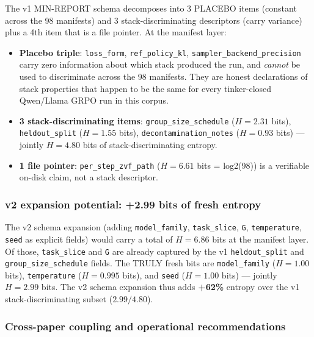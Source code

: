 \documentclass{article}  \usepackage[preprint,nonatbib]{neurips_2026} \usepackage[numbers]{natbib}
\begin{document}
The v1 MIN-REPORT schema decomposes into 3 PLACEBO items (constant across the 98 manifests) and 3 stack-discriminating descriptors (carry variance) plus a 4th item that is a file pointer. At the manifest layer:
\begin{itemize}
  \item \textbf{Placebo triple}: \texttt{loss\_form}, \texttt{ref\_policy\_kl}, \texttt{sampler\_backend\_precision} carry zero information about which stack produced the run, and \emph{cannot} be used to discriminate across the 98 manifests. They are honest declarations of stack properties that happen to be the same for every tinker-closed Qwen/Llama GRPO run in this corpus.
  \item \textbf{3 stack-discriminating items}: \texttt{group\_size\_schedule} ($H{=}2.31$ bits), \texttt{heldout\_split} ($H{=}1.55$ bits), \texttt{decontamination\_notes} ($H{=}0.93$ bits) --- jointly $H{=}4.80$ bits of stack-discriminating entropy.
  \item \textbf{1 file pointer}: \texttt{per\_step\_zvf\_path} ($H{=}6.61$ bits = log2(98)) is a verifiable on-disk claim, not a stack descriptor.
\end{itemize}

\subsubsection{v2 expansion potential: +2.99 bits of fresh entropy}
\label{sec:p5-iter169-v2-expansion}

The v2 schema expansion (adding \texttt{model\_family}, \texttt{task\_slice}, \texttt{G}, \texttt{temperature}, \texttt{seed} as explicit fields) would carry a total of $H{=}6.86$ bits at the manifest layer. Of those, \texttt{task\_slice} and \texttt{G} are already captured by the v1 \texttt{heldout\_split} and \texttt{group\_size\_schedule} fields. The TRULY fresh bits are \texttt{model\_family} ($H{=}1.00$ bits), \texttt{temperature} ($H{=}0.995$ bits), and \texttt{seed} ($H{=}1.00$ bits) --- jointly $H{=}2.99$ bits. The v2 schema expansion thus adds \textbf{+62\%} entropy over the v1 stack-discriminating subset ($2.99 / 4.80$).

\subsubsection{Cross-paper coupling and operational recommendations}
\label{sec:p5-iter169-coupling}
\end{document}
